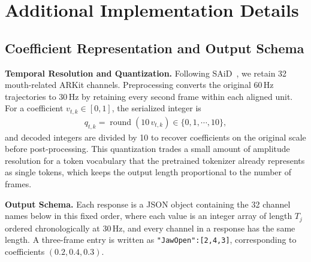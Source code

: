 \section{Additional Implementation Details}
\label{app:implementation}

\subsection{Coefficient Representation and Output Schema}
\label{app:json}

\noindent\textbf{Temporal Resolution and Quantization.}\quad
Following SAiD~\citep{park2023said}, we retain 32 mouth-related ARKit channels. Preprocessing converts the original 60\,Hz trajectories to 30\,Hz by retaining every second frame within each aligned unit. For a coefficient $v_{t,k}\in[0,1]$, the serialized integer is
\begin{gather}
    q_{t,k}=\operatorname{round}\!\left(10\,v_{t,k}\right)\in\{0,1,\cdots,10\},
\end{gather}
and decoded integers are divided by 10 to recover coefficients on the original scale before post-processing. This quantization trades a small amount of amplitude resolution for a token vocabulary that the pretrained tokenizer already represents as single tokens, which keeps the output length proportional to the number of frames.

\noindent\textbf{Output Schema.}\quad
Each response is a JSON object containing the 32 channel names below in this fixed order, where each value is an integer array of length $T_{j}$ ordered chronologically at 30\,Hz, and every channel in a response has the same length. A three-frame entry is written as \texttt{"JawOpen":[2,4,3]}, corresponding to coefficients $(0.2,0.4,0.3)$.

